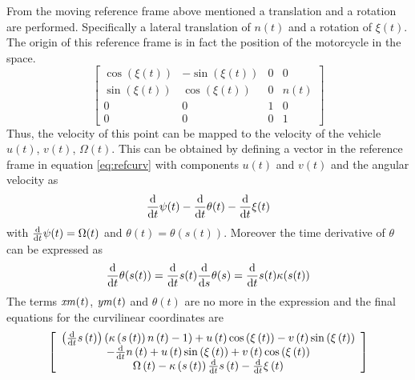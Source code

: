 %
From the moving reference frame above mentioned a translation and a rotation are performed. Specifically a lateral translation of $n(t)$ and a rotation of $\xi(t)$. The origin of this reference frame is in fact the position of the motorcycle in the space.
%
\begin{equation}
    \left[ \begin{array}{cccc} 
        \cos \left(\xi \left(t \right)\right)&-\sin \left(\xi \left(t \right)\right)&0&0\\
        \sin \left(\xi \left(t \right)\right)&\cos \left(\xi \left(t \right)\right)&0&n(t)\\
        0&0&1&0\\
        0&0&0&1
    \end{array} \right]  
    \label{eq:refcurv}  
\end{equation}
%
Thus, the velocity of this point can be mapped to the velocity of the vehicle $u(t)$, $v(t)$, $\Omega(t)$. This can be obtained by defining a vector in the reference frame in equation \ref{eq:refcurv} with components $u(t)$ and $v(t)$ and the angular velocity as 
%
\begin{equation}
    \frac{\rm d}{{\rm d}t}\psi(t)-\frac{\rm d}{{\rm d}t}\theta(t)-\frac{\rm d}{{\rm d}t}\xi(t)    
\end{equation}
%
with $\frac{\rm d}{{\rm d}t}\psi(t) = \Omega(t)$ and $\theta(t)=\theta(s(t))$. Moreover the time derivative of $\theta$ can be expressed as 
%
\begin{equation}
    \frac{\rm d}{{\rm d}t}\theta(s(t))=\frac{\rm d}{{\rm d}t}s(t) \frac{\rm d}{{\rm d}s}\theta(s) = \frac{\rm d}{{\rm d}t}s(t) \kappa(s(t))
\end{equation}
%
The terms $\it xm(t)$, $\it ym(t)$ and $\theta(t)$ are no more in the expression and the final equations for the curvilinear coordinates are
%
\begin{equation}
\left[ \begin{array}{c}  
    \left( {\frac {\rm d}{{\rm d}t}}s \left( t\right)  \right)  \left( \kappa \left( s \left( t \right)  \right) n\left( t \right) -1 \right) +u \left( t \right) \cos \left( \xi\left( t \right)  \right) -v \left( t \right) \sin \left( \xi \left( t \right)  \right) \\ 
    -{\frac {\rm d}{{\rm d}t}}n\left( t \right) +u \left( t \right) \sin \left( \xi \left( t\right)  \right) +v \left( t \right) \cos \left( \xi \left( t\right)  \right) \\ 
    \Omega \left( t \right) -\kappa\left( s \left( t \right)  \right) {\frac {\rm d}{{\rm d}t}}s \left( t \right) -{\frac {\rm d}{{\rm d}t}}\xi \left( t \right) 
\end{array}\right]
\end{equation}
